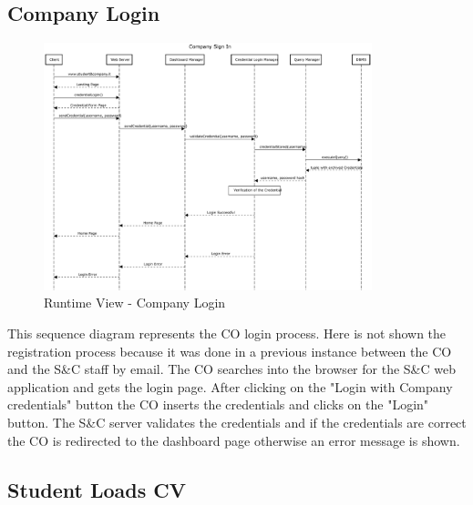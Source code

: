 
\subsection{Company Login}
\label{sub:company-login}%

\begin{figure}[H]
      \centering
      \includegraphics[width=0.85\textwidth]{Images/RV_01b.pdf}
      \caption{Runtime View - Company Login}
      \label{fig:rv-company-login}
\end{figure}

\par This sequence diagram represents the CO login process. Here is not shown the registration process because it was done
in a previous instance between the CO and the S\&C staff by email. The CO searches into the browser for the S\&C
web application and gets the login page. After clicking on the "Login with Company credentials" button the CO
inserts the credentials and clicks on the "Login" button. The S\&C server validates the credentials and if the credentials
are correct the CO is redirected to the dashboard page otherwise an error message is shown.


\subsection{Student Loads CV}
\label{sub:student-loads-cv}%

